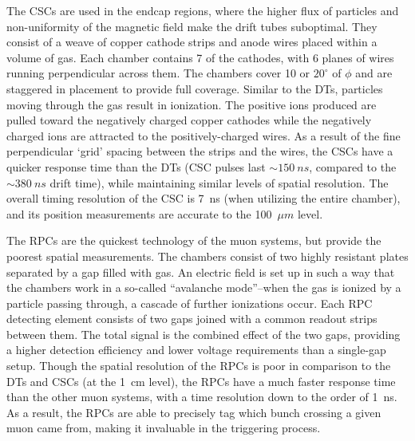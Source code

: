 The CSCs are used in the endcap regions, where the higher flux of particles and 
non-uniformity of the magnetic field make the drift tubes suboptimal. They
consist of a weave of copper cathode strips and anode wires placed within a
volume of gas. Each chamber contains 7 of the cathodes, with 6 planes of wires
running perpendicular across them. The chambers cover 10 or $20^\circ$ of $\phi$
and are staggered in placement to provide full coverage.  Similar to the DTs,
particles moving through the gas result in ionization. The positive ions
produced are pulled toward the negatively charged copper cathodes while the
negatively charged ions are attracted to the positively-charged wires.  As a
result of the fine perpendicular `grid' spacing between the strips and the
wires, the CSCs have a quicker response time than the DTs (CSC pulses last
$\sim 150~ns$, compared to the $\sim 380~ns$ drift time), while maintaining
similar levels of spatial resolution. The overall timing resolution of the CSC
is 7~ns (when utilizing the entire chamber), and its position measurements are
accurate to the 100~$\mu m$ level.

The RPCs are the quickest technology of the muon systems, but provide the
poorest spatial measurements. The chambers consist of two highly resistant
plates separated by a gap filled with gas. An electric field is set up in such a
way that the chambers work in a so-called ``avalanche mode''--when the gas is
ionized by a particle passing through, a cascade of further ionizations occur.
Each RPC detecting element consists of two gaps joined with a common readout
strips between them. The total signal is the combined effect of the two gaps,
providing a higher detection efficiency and lower voltage requirements than a
single-gap setup. Though the spatial resolution of the RPCs is poor in
comparison to the DTs and CSCs (at the 1~cm level), the RPCs have a much
faster response time than the other muon systems, with a time resolution down
to the order of 1~ns. As a result, the RPCs are able to precisely tag which
bunch crossing a given muon came from, making it invaluable in the triggering
process.

